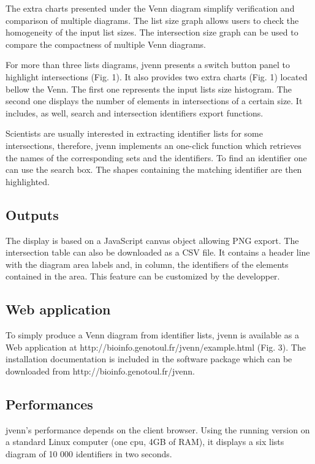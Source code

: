 \documentclass{bmcart}
\begin{document}
The extra charts presented under the Venn diagram simplify verification and
comparison of multiple diagrams. The list size graph allows users to check the
homogeneity of the input list sizes. The intersection size graph can be used to
compare the compactness of multiple Venn diagrams.

For more than three lists diagrams, jvenn presents a switch button panel to 
highlight intersections (Fig. 1). It also provides two extra charts (Fig. 1) 
located bellow the Venn. The first one represents the input lists size
histogram. The second one displays the number of elements in intersections of a
certain size. It includes, as well, search and intersection identifiers export 
functions.

Scientists are usually interested in extracting identifier lists for some
intersections, therefore, jvenn implements an one-click function which retrieves
the names of the corresponding sets and the identifiers. To find an identifier
one can use the search box. The shapes containing the matching identifier are
then highlighted.

\subsection*{Outputs}

The display is based on a JavaScript canvas object allowing PNG export. The 
intersection table can also be downloaded as a CSV file. It contains a header 
line with the diagram area labels and, in column, the identifiers of the
elements contained in the area. This feature can be customized by the
developper.

\subsection*{Web application}

To simply produce a Venn diagram from identifier lists, jvenn is 
available as a Web application at http://bioinfo.genotoul.fr/jvenn/example.html
(Fig. 3).
The installation documentation is included in the software package which can be
downloaded from http://bioinfo.genotoul.fr/jvenn.

\subsection*{Performances}

jvenn's performance depends on the client browser. Using the running version
on a standard Linux computer (one cpu, 4GB of RAM), it displays a six lists
diagram of 10 000 identifiers in two seconds.
\end{document}
